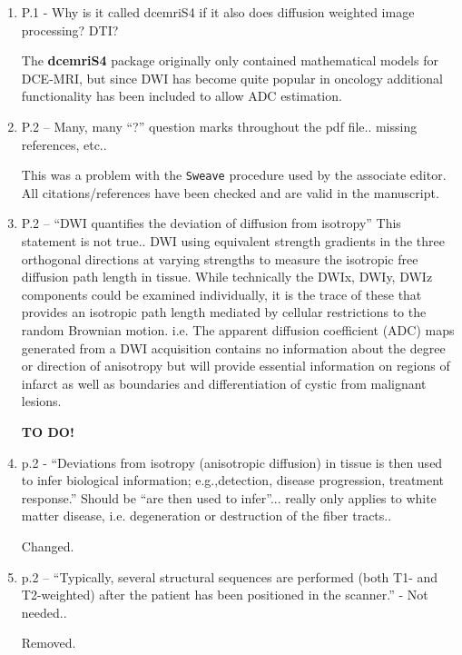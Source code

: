 \documentclass[11pt]{article}
\begin{document}
\begin{enumerate}

\item P.1 - Why is it called dcemriS4 if it also does diffusion
  weighted image processing? DTI?

  The \textbf{dcemriS4} package originally only contained
  mathematical models for DCE-MRI, but since DWI has become quite
  popular in oncology additional functionality has been included to
  allow ADC estimation.  

\item P.2 – Many, many ``?'' question marks throughout the pdf
  file.. missing references, etc..

  This was a problem with the \texttt{Sweave} procedure used by the
  associate editor.  All citations/references have been checked and
  are valid in the manuscript.

\item P.2 – ``DWI quantifies the deviation of diffusion from
  isotropy'' This statement is not true..  DWI using equivalent
  strength gradients in the three orthogonal directions at varying
  strengths to measure the isotropic free diffusion path length in
  tissue. While technically the DWIx, DWIy, DWIz components could be
  examined individually, it is the trace of these that provides an
  isotropic path length mediated by cellular restrictions to the
  random Brownian motion.  i.e. The apparent diffusion coefficient
  (ADC) maps generated from a DWI acquisition contains no information
  about the degree or direction of anisotropy but will provide
  essential information on regions of infarct as well as boundaries
  and differentiation of cystic from malignant lesions.

  \textbf{TO DO!}

\item p.2 - ``Deviations from isotropy (anisotropic diffusion) in
  tissue is then used to infer biological information; e.g.,detection,
  disease progression, treatment response.''  Should be ``are then
  used to infer''... really only applies to white matter disease, i.e.
  degeneration or destruction of the fiber tracts..

  Changed.

\item p.2 – ``Typically, several structural sequences are performed
  (both T1- and T2-weighted) after the patient has been positioned in
  the scanner.'' - Not needed..

  Removed.


\end{enumerate}
\end{document}
